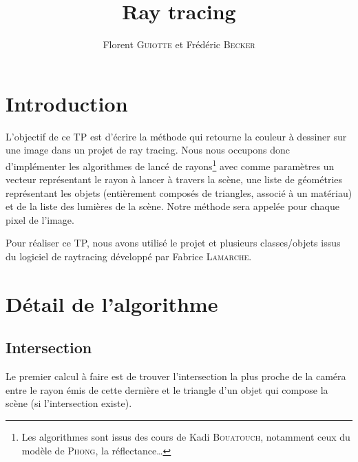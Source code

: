 \documentclass{article}
\author{Florent \textsc{Guiotte} et Frédéric \textsc{Becker}}
\title{Ray tracing}
\begin{document}
\maketitle
\tableofcontents

\section{Introduction}

L'objectif de ce TP est d'écrire la méthode qui retourne la couleur à dessiner sur une image dans un projet de ray tracing.
Nous nous occupons donc d'implémenter les algorithmes de lancé de rayons\footnote{Les algorithmes sont issus des cours de
    Kadi \textsc{Bouatouch}, notamment ceux du modèle de \textsc{Phong}, la réflectance\ldots} avec comme paramètres un vecteur représentant
le rayon à lancer à travers la scène, une liste de géométries représentant les objets (entièrement composés de
triangles, associé à un matériau) et de la liste des lumières de la scène. Notre méthode sera appelée pour chaque pixel
de l'image.

Pour réaliser ce TP, nous avons utilisé le projet et plusieurs classes/objets issus du logiciel de raytracing développé par
Fabrice \textsc{Lamarche}.



\section{Détail de l'algorithme}
\subsection{Intersection}

Le premier calcul à faire est de trouver l'intersection la plus proche de la caméra entre le rayon émis de cette
dernière et le triangle d'un objet qui compose la scène (si l'intersection existe). 
\end{document}
